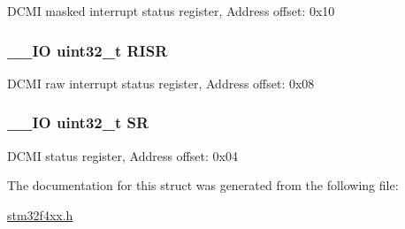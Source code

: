 D\-C\-M\-I masked interrupt status register, Address offset\-: 0x10 \hypertarget{struct_d_c_m_i___type_def_aa196fddf0ba7d6e3ce29bdb04eb38b94}{
\subsubsection[{R\-I\-S\-R}]{\setlength{\rightskip}{0pt plus 5cm}\-\_\-\-\_\-\-I\-O uint32\-\_\-t R\-I\-S\-R}}\label{struct_d_c_m_i___type_def_aa196fddf0ba7d6e3ce29bdb04eb38b94}
D\-C\-M\-I raw interrupt status register, Address offset\-: 0x08 \hypertarget{struct_d_c_m_i___type_def_af6aca2bbd40c0fb6df7c3aebe224a360}{
\subsubsection[{S\-R}]{\setlength{\rightskip}{0pt plus 5cm}\-\_\-\-\_\-\-I\-O uint32\-\_\-t S\-R}}\label{struct_d_c_m_i___type_def_af6aca2bbd40c0fb6df7c3aebe224a360}
D\-C\-M\-I status register, Address offset\-: 0x04 

The documentation for this struct was generated from the following file\-:\begin{DoxyCompactItemize}
\item 
\hyperlink{stm32f4xx_8h}{stm32f4xx.\-h}\end{DoxyCompactItemize}
